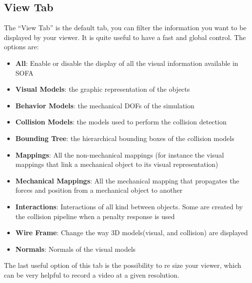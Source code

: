 \subsection{View Tab}
The ``View Tab'' is the default tab, you can filter the information you want to be displayed by your viewer. It is quite useful to have a fast and global control. 
The options are:
\begin{itemize}
 \item {\bf All}: Enable or disable the display of all the visual information available in SOFA
 \item {\bf Visual Models}: the graphic representation of the objects
\item {\bf Behavior Models}: the mechanical DOFs of the simulation
\item {\bf Collision Models}: the models used to perform the collision detection
\item {\bf Bounding Tree}: the hierarchical bounding boxes of the collision models
\item {\bf Mappings}: All the non-mechanical mappings (for instance the visual mappings that link a mechanical object to its visual representation)
\item {\bf Mechanical Mappings}: All the mechanical mapping that propagates the forces and position from a mechanical object to another
\item {\bf Interactions}: Interactions of all kind between objects. Some are created by the collision pipeline when a penalty response is used
\item {\bf Wire Frame}: Change the way 3D models(visual, and collision) are displayed
\item {\bf Normals}: Normals of the visual models
\end{itemize}

The last useful option of this tab is the possibility to re size your viewer, which can be very helpful to record a video at a given resolution.









